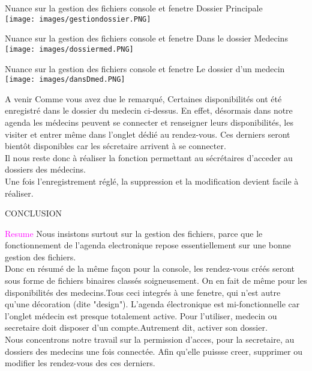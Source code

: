 \documentclass{beamer}
\begin{document}
\begin{frame}{Nuance sur la gestion des fichiers console et fenetre}
	 Dossier Principale \\ \texttt{[image: images/gestiondossier.PNG]}
\end{frame}

\begin{frame}{Nuance sur la gestion des fichiers console et fenetre}
Dans le dossier Medecins\\ \texttt{[image: images/dossiermed.PNG]} 
\end{frame}

\begin{frame}{Nuance sur la gestion des fichiers console et fenetre}
Le dossier d'un medecin\\ \texttt{[image: images/dansDmed.PNG]} \\  
\end{frame}
\begin{frame}[t]{A venir}
Comme vous avez due le remarqué, Certaines disponibilités ont été enregistré dans le dossier du medecin ci-dessus. \pause En effet, désormais dans notre agenda  les médecins peuvent se connecter et renseigner leurs disponibilités, les visiter et entrer même
dans l'onglet dédié au rendez-vous. \pause Ces derniers seront bientôt disponibles car les sécretaire arrivent à se connecter. \\
\pause Il nous reste donc à réaliser la fonction permettant au sécrétaires d'acceder au dossiers des médecins.\\
Une fois l'enregistrement réglé, la suppression et la modification devient facile à réaliser. 
\end{frame}

\begin{frame}[t]{CONCLUSION}
\begin{block}{\textcolor{magenta}{Resume}}
	Nous insistons surtout sur la gestion des fichiers, parce que le fonctionnement de l'agenda electronique repose essentiellement sur une bonne gestion des fichiers. \\
Donc en résumé de  la même  façon pour la console, les rendez-vous créés seront sous forme de fichiers binaires classés soigneusement. On en fait de même pour les disponibilités des medecins.Tous ceci integrés à une fenetre, qui n'est autre qu'une décoration (dite "design"). L'agenda électronique est mi-fonctionnelle car l'onglet médecin est presque totalement active. Pour l'utiliser, medecin ou secretaire doit disposer d'un compte.Autrement dit, activer son dossier. \\ 
Nous concentrons notre travail sur la permission d'acces, pour la secretaire, au dossiers des medecins une fois connectée. Afin qu'elle puissse creer, supprimer ou modifier les rendez-vous des ces derniers.
\end{block}
\end{frame}
\end{document}
